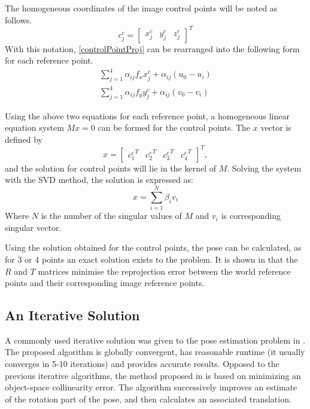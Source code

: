 The homogeneous coordinates of the image control points will be noted as follows.
\begin{equation}
	c_j^c = 
	\begin{bmatrix}
		x_j^c & y_j^c & z_j^c
	\end{bmatrix}^T
\end{equation}
With this notation, \eqref{controlPointProj} can be rearranged into the following form for each reference point.
\begin{align}
	\sum_{j=1}^{4} \alpha_{ij} f_x x_j^c + \alpha_{ij} (u_0 - u_i) \\
	\sum_{j=1}^{4} \alpha_{ij} f_y y_j^c + \alpha_{ij} (v_0 - v_i) 
\end{align}

Using the above two equations for each reference point, a homogeneous linear equation system $Mx = 0$ can be formed for the control points.
The $x$ vector is defined by
\begin{equation}
x = 
	\begin{bmatrix}
		{c_1^c}^T & {c_2^c}^T & {c_3^c}^T & {c_4^c}^T
	\end{bmatrix}^T,
\end{equation}
and the solution for control points will lie in the kernel of $M$.
Solving the system with the SVD method, the solution is expressed as:
\begin{equation}
	x = \sum_{i=1}^{N} \beta_i v_i
\end{equation}
Where $N$ is the number of the singular values of $M$ and $v_i$ is corresponding singular vector.

Using the solution obtained for the control points, the pose can be calculated, as for 3 or 4 points an exact solution exists to the problem.
It is shown in \cite{Lepetit2008} that the $R$ and $T$ matrices minimise the reprojection error between the world reference points and their corresponding image reference points.

\subsection{An Iterative Solution}

A commonly used iterative solution was given to the pose estimation problem in \cite{iterative}.
The proposed algorithm is globally convergent, has reasonable runtime (it usually converges in 5-10 iterations) and provides accurate results.
Opposed to the previous iterative algorithms, the method proposed in \cite{iterative} is based on minimizing an object-space collinearity error.
The algorithm successively improves an estimate of the rotation part of the pose, and then calculates an associated translation.

